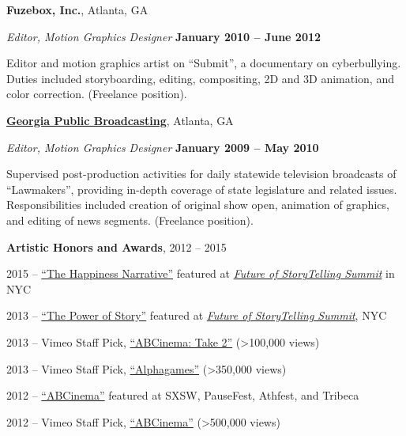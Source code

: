 \documentclass[10pt]{article}
\newcommand{\halfblankline}{\quad\vspace{-0.5\baselineskip}\pagebreak[3]}
\begin{document}
	\halfblankline

	\textbf{Fuzebox, Inc.},
Atlanta, GA
\begin{outerlist}
	\item[] \textit{Editor, Motion Graphics Designer}%
	\hfill \textbf{January 2010 -- June 2012}
	\begin{innerlist}
		\item Editor and motion graphics artist on ``Submit'', a documentary on cyberbullying. Duties included storyboarding, editing, compositing, 2D and 3D animation, and color correction. (Freelance position).
	\end{innerlist}		
\end{outerlist}

	\halfblankline

	\href{https://www.gpb.org/}{\textbf{Georgia Public Broadcasting}},
Atlanta, GA
\begin{outerlist}
	\item[] \textit{Editor, Motion Graphics Designer}%
	\hfill \textbf{January 2009 -- May 2010}
	\begin{innerlist}
		\item Supervised post-production activities for daily statewide television broadcasts of ``Lawmakers'', providing in-depth coverage of state legislature and related issues. Responsibilities included creation of original show open, animation of graphics, and editing of news segments. (Freelance position).
	\end{innerlist}		
\end{outerlist}

	\halfblankline

	\textbf{Artistic Honors and Awards}, 2012 -- 2015
\begin{outerlist}
		\item 2015 -- \href{https://futureofstorytelling.org/video/jennifer-aaker-the-happiness-narrative} {``The Happiness Narrative''} featured at \href{https://futureofstorytelling.org/summit}{\emph{Future of StoryTelling Summit}} in NYC
		\item 2013 -- \href{https://futureofstorytelling.org/video/jennifer-aaker-the-power-of-story} {``The Power of Story''} featured at \href{https://futureofstorytelling.org/summit}{\emph{Future of StoryTelling Summit}}, NYC
		\item 2013 -- Vimeo Staff Pick, \href{https://vimeo.com/59869690} {``ABCinema: Take 2''} (>100,000 views)
		\item 2013 -- Vimeo Staff Pick, \href{https://vimeo.com/52346538} {``Alphagames''} (>350,000 views)
		\item 2012 -- \href{https://vimeo.com/36816268} {``ABCinema''} featured at SXSW, PauseFest, Athfest, and Tribeca
		\item 2012 -- Vimeo Staff Pick, \href{https://vimeo.com/36816268} {``ABCinema''} (>500,000 views)
\end{outerlist}
	
\end{document}
